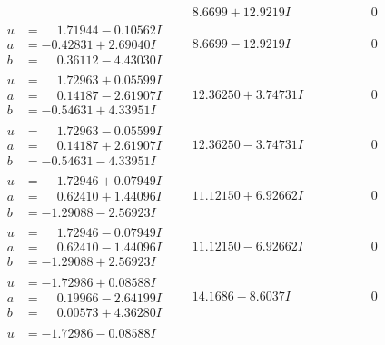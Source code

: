 \documentclass[1p]{elsarticle_modified}
\theoremstyle{definition}
\begin{document}
$$\begin{array}{c|c|c}
 & \phantom{-}8.6699 + 12.9219 I & \phantom{-0.000000 } 0 \\ \hline\begin{aligned}
u &= \phantom{-}1.71944 - 0.10562 I \\
a &= -0.42831 + 2.69040 I \\
b &= \phantom{-}0.36112 - 4.43030 I\end{aligned}
 & \phantom{-}8.6699 - 12.9219 I & \phantom{-0.000000 } 0 \\ \hline\begin{aligned}
u &= \phantom{-}1.72963 + 0.05599 I \\
a &= \phantom{-}0.14187 - 2.61907 I \\
b &= -0.54631 + 4.33951 I\end{aligned}
 & \phantom{-}12.36250 + 3.74731 I & \phantom{-0.000000 } 0 \\ \hline\begin{aligned}
u &= \phantom{-}1.72963 - 0.05599 I \\
a &= \phantom{-}0.14187 + 2.61907 I \\
b &= -0.54631 - 4.33951 I\end{aligned}
 & \phantom{-}12.36250 - 3.74731 I & \phantom{-0.000000 } 0 \\ \hline\begin{aligned}
u &= \phantom{-}1.72946 + 0.07949 I \\
a &= \phantom{-}0.62410 + 1.44096 I \\
b &= -1.29088 - 2.56923 I\end{aligned}
 & \phantom{-}11.12150 + 6.92662 I & \phantom{-0.000000 } 0 \\ \hline\begin{aligned}
u &= \phantom{-}1.72946 - 0.07949 I \\
a &= \phantom{-}0.62410 - 1.44096 I \\
b &= -1.29088 + 2.56923 I\end{aligned}
 & \phantom{-}11.12150 - 6.92662 I & \phantom{-0.000000 } 0 \\ \hline\begin{aligned}
u &= -1.72986 + 0.08588 I \\
a &= \phantom{-}0.19966 - 2.64199 I \\
b &= \phantom{-}0.00573 + 4.36280 I\end{aligned}
 & \phantom{-}14.1686 - 8.6037 I & \phantom{-0.000000 } 0 \\ \hline\begin{aligned}
u &= -1.72986 - 0.08588 I \\

\end{aligned}
\end{array}$$
\end{document}
